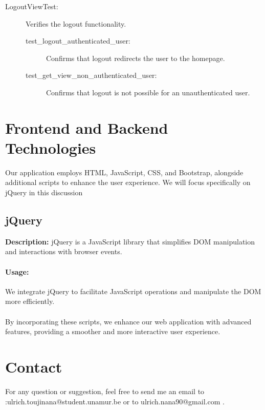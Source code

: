 \documentclass[12pt]{article}
\begin{document}
\begin{description}
  \item[LogoutViewTest:] Verifies the logout functionality.
  \begin{description}
    \item[test\_logout\_authenticated\_user:] Confirms that logout redirects the user to the homepage.
    \item[test\_get\_view\_non\_authenticated\_user:] Confirms that logout is not possible for an unauthenticated user.
  \end{description}
\end{description}









\section{Frontend and Backend Technologies}

Our application employs HTML, JavaScript, CSS, and Bootstrap, alongside additional scripts to enhance the user experience. We will focus specifically on jQuery in this discussion

\subsection*{jQuery}

\textbf{Description:} jQuery is a JavaScript library that simplifies DOM manipulation and interactions with browser events.

\paragraph{Usage:} We integrate jQuery to facilitate JavaScript operations and manipulate the DOM more efficiently.



\paragraph{}By incorporating these scripts, we enhance our web application with advanced features, providing a smoother and more interactive user experience. 

\section{Contact}
For any question or suggestion, feel free to send me an email to :ulrich.toujinana@student.unamur.be or to ulrich.nana90@gmail.com .
\end{document}
